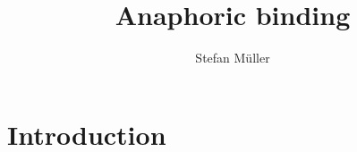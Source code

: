\documentclass[output=paper
 	        ,biblatex
                ,babelshorthands
                ,newtxmath
                ,draftmode
                ,colorlinks, citecolor=brown
]{langscibook}
\title{Anaphoric binding}
\author{%
Stefan Müller\affiliation{Humboldt-Universität zu Berlin}
}
\begin{document}
\maketitle
\label{chap-binding}

\section{Introduction} 




\end{document}

